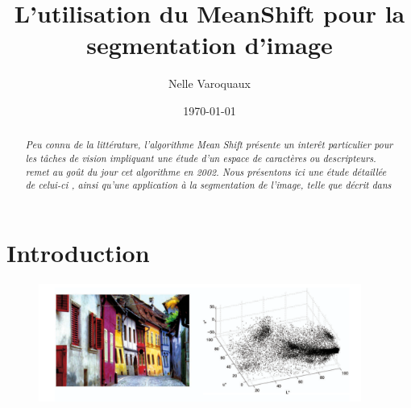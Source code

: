 \documentclass{article}
\date{\today}
\title{L'utilisation du MeanShift pour la segmentation d'image}
\author{Nelle Varoquaux}
\begin{document}
\maketitle

\begin{abstract} \textit{Peu connu de la littérature, l'algorithme Mean Shift
présente un interêt particulier pour les tâches de vision impliquant une étude
d'un espace de caractères ou descripteurs. \cite{my_article} remet au goût du
jour cet algorithme en 2002. Nous présentons ici une étude détaillée de celui-ci
, ainsi qu'une application à la segmentation de l'image, telle que
décrit dans \cite{my_article}} \end{abstract}

\section{Introduction}

\begin{figure}
\includegraphics[width=400px]{images/color_space.png}
\end{figure}
\end{document}
